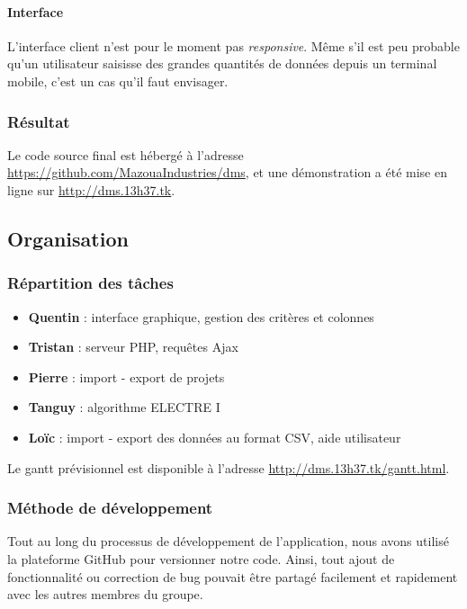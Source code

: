 \documentclass[a4paper]{article}
\begin{document}
\paragraph{Interface} L'interface client n'est pour le moment pas \textit{responsive}. Même s'il est peu probable qu'un utilisateur saisisse des grandes quantités de données depuis un terminal mobile, c'est un cas qu'il faut envisager.

\subsubsection{Résultat}

Le code source final est hébergé à l'adresse \url{https://github.com/MazouaIndustries/dms}, et une démonstration a été mise en ligne sur \url{http://dms.13h37.tk}.

\newpage

\subsection{Organisation}

\subsubsection{Répartition des tâches}

\begin{itemize}
\item \textbf{Quentin} : interface graphique, gestion des critères et colonnes
\item \textbf{Tristan} : serveur PHP, requêtes Ajax
\item \textbf{Pierre} : import - export de projets
\item \textbf{Tanguy} : algorithme ELECTRE I
\item \textbf{Loïc} : import - export des données au format CSV, aide utilisateur
\end{itemize}

Le gantt prévisionnel est disponible à l'adresse
\url{http://dms.13h37.tk/gantt.html}.

\subsubsection{Méthode de développement}

Tout au long du processus de développement de l'application, nous avons utilisé la plateforme GitHub pour versionner notre code. Ainsi, tout ajout de fonctionnalité ou correction de bug pouvait être partagé facilement et rapidement avec les autres membres du groupe.
\end{document}
